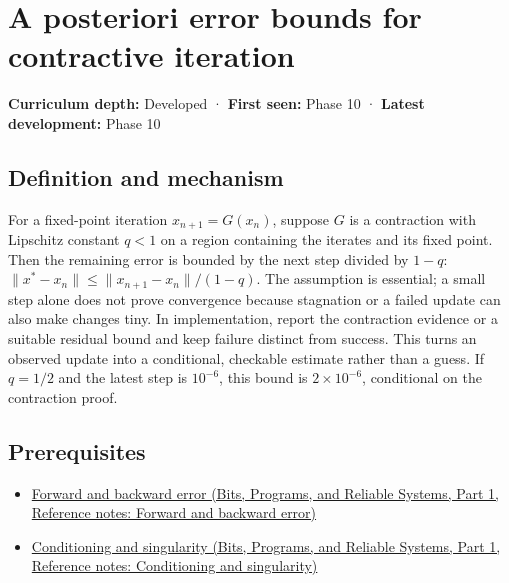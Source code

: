 \hypertarget{appendix-d83b0ad1be7f}{}\label{referencestart:appendix-d83b0ad1be7f}
\section{A posteriori error bounds for contractive iteration}\label{appendix-d83b0ad1be7f-a-posteriori-error-bounds-for-contractive-iteration}

\hypertarget{appendix-d83b0ad1be7f-a-posteriori-error-bounds-for-contractive-iteration}{}

\textbf{Curriculum depth:} Developed · \textbf{First seen:} Phase 10 · \textbf{Latest development:} Phase 10

\begin{allmightroledefinition}

\subsection{Definition and mechanism}\label{appendix-d83b0ad1be7f-definition-and-mechanism}

\hypertarget{appendix-d83b0ad1be7f-definition-and-mechanism}{}

For a fixed-point iteration \(x_{n+1}=G(x_n)\), suppose \(G\) is a contraction with Lipschitz constant \(q<1\) on a region containing the iterates and its fixed point. Then the remaining error is bounded by the next step divided by \(1-q\): \(\|x^*-x_n\|\le\|x_{n+1}-x_n\|/(1-q)\). The assumption is essential; a small step alone does not prove convergence because stagnation or a failed update can also make changes tiny. In implementation, report the contraction evidence or a suitable residual bound and keep failure distinct from success. This turns an observed update into a conditional, checkable estimate rather than a guess. If \(q=1/2\) and the latest step is \(10^{-6}\), this bound is \(2\times10^{-6}\), conditional on the contraction proof.

\end{allmightroledefinition}

\subsection{Prerequisites}\label{appendix-d83b0ad1be7f-prerequisites}

\hypertarget{appendix-d83b0ad1be7f-prerequisites}{}

\begin{itemize}
\tightlist
\item
  \href{../01-Bits-Programs-and-Reliable-Systems-P01/main.pdf\#appendix-a7fbaf6d1b1c}{Forward and backward error (Bits, Programs, and Reliable Systems, Part 1, Reference notes: Forward and backward error)}
\item
  \href{../01-Bits-Programs-and-Reliable-Systems-P01/main.pdf\#appendix-8f6a01f284a7}{Conditioning and singularity (Bits, Programs, and Reliable Systems, Part 1, Reference notes: Conditioning and singularity)}
\end{itemize}

